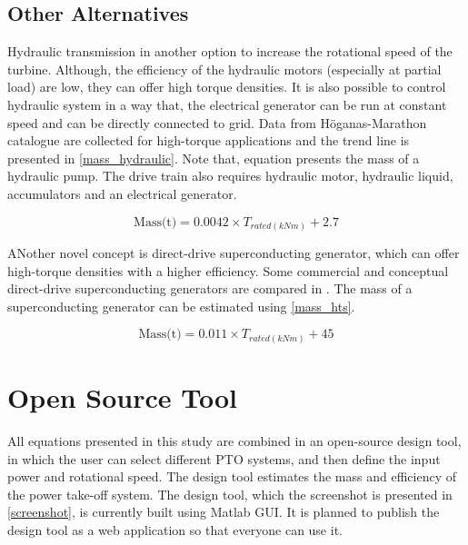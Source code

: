 \documentclass{article}\usepackage{graphicx, color}
\begin{document}

\subsection{Other Alternatives}

Hydraulic transmission in another option to increase the rotational speed of the turbine. Although, the efficiency of the hydraulic motors (especially at partial load) are low, they can offer high torque densities. It is also possible to control hydraulic system in a way that, the electrical generator can be run at constant speed and can be directly connected to grid. Data from H\"{o}ganas-Marathon catalogue are collected for high-torque applications \cite{Hagglunds2012} and the trend line is presented in \autoref{mass_hydraulic}. Note that, equation presents the mass of a hydraulic pump. The drive train also requires hydraulic motor, hydraulic liquid, accumulators and an electrical generator.

\begin{equation}
  \text{Mass(t)} = 0.0042 \times {T_{rated(kNm)}} + 2.7
  \label{mass_hydraulic}
\end{equation}

ANother novel concept is direct-drive superconducting generator, which can offer high-torque densities with a higher efficiency. Some commercial and conceptual direct-drive superconducting generators are compared in \cite{Keysan2011b}. The mass of a superconducting generator can be estimated using \autoref{mass_hts}.

\begin{equation}
  \text{Mass(t)} = 0.011 \times {T_{rated(kNm)}} + 45
  \label{mass_hts}
\end{equation}

\section{Open Source Tool}
\label{access}
All equations presented in this study are combined in an open-source design tool, in which the user can select different PTO systems, and then define the input power and rotational speed. The design tool estimates the mass and efficiency of the power take-off system. The design tool, which the screenshot is presented in \autoref{screenshot}, is currently built using Matlab GUI. It is planned to publish the design tool as a web application so that everyone can use it. 
\end{document}

